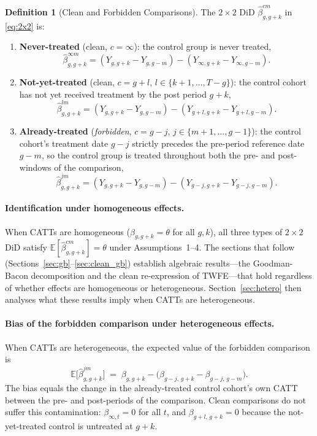 \documentclass[12pt,letterpaper]{article}
\theoremstyle{remark}
\theoremstyle{definition}
\newtheorem{definition}{Definition}[section]
\newcommand{\E}{\mathbb{E}}
\newcommand{\hbeta}{\hat{\beta}}
\begin{document}
\begin{definition}[Clean and Forbidden Comparisons]
  \label{def:types}
  The $2\times2$ DiD $\hbeta^{cm}_{g,g+k}$ in \eqref{eq:2x2} is:
  \begin{enumerate}
    \item \textbf{Never-treated} (clean, $c=\infty$): the control group is
      never treated,
      \[
        \hbeta^{\infty m}_{g,g+k}
        = (Y_{g,g+k}-Y_{g,g-m})-(Y_{\infty,g+k}-Y_{\infty,g-m}).
      \]
    \item \textbf{Not-yet-treated} (clean, $c=g+l$, $l\in\{k+1,\ldots,T-g\}$):
      the control cohort has not yet received treatment by the post period
      $g+k$,
      \[
        \hbeta^{lm}_{g,g+k}
        = (Y_{g,g+k}-Y_{g,g-m})-(Y_{g+l,g+k}-Y_{g+l,g-m}).
      \]
    \item \textbf{Already-treated} (\emph{forbidden}, $c=g-j$,
      $j\in\{m+1,\ldots,g-1\}$): the control cohort's treatment date $g-j$
      strictly precedes the pre-period reference date $g-m$, so the control
      group is treated throughout both the pre- and post-windows of the
      comparison,
      \[
        \hbeta^{jm}_{g,g+k}
        = (Y_{g,g+k}-Y_{g,g-m})-(Y_{g-j,g+k}-Y_{g-j,g-m}).
      \]
  \end{enumerate}
\end{definition}

\paragraph{Identification under homogeneous effects.}
When CATTs are homogeneous ($\beta_{g,g+k}=\theta$ for all $g,k$), all three
types of $2\times2$ DiD satisfy $\E[\hbeta^{cm}_{g,g+k}]=\theta$ under
Assumptions~1--4. The sections that follow (Sections~\ref{sec:gb}--\ref{sec:clean_gb})
establish algebraic results---the Goodman-Bacon decomposition and the clean
re-expression of TWFE---that hold regardless of whether effects are
homogeneous or heterogeneous. Section~\ref{sec:hetero} then analyses what
these results imply when CATTs are heterogeneous.

\paragraph{Bias of the forbidden comparison under heterogeneous effects.}
When CATTs are heterogeneous, the expected value of the forbidden comparison is
\begin{equation}
  \E\bigl[\hbeta^{jm}_{g,g+k}\bigr]
  \;=\;
  \beta_{g,g+k}
  - \bigl(\beta_{g-j,\,g+k} - \beta_{g-j,\,g-m}\bigr).
  \label{eq:bias}
\end{equation}
The bias equals the change in the already-treated control cohort's own CATT
between the pre- and post-periods of the comparison. Clean comparisons do not
suffer this contamination: $\beta_{\infty,t}=0$ for all $t$, and
$\beta_{g+l,\,g+k}=0$ because the not-yet-treated control is untreated at
$g+k$.
\end{document}
